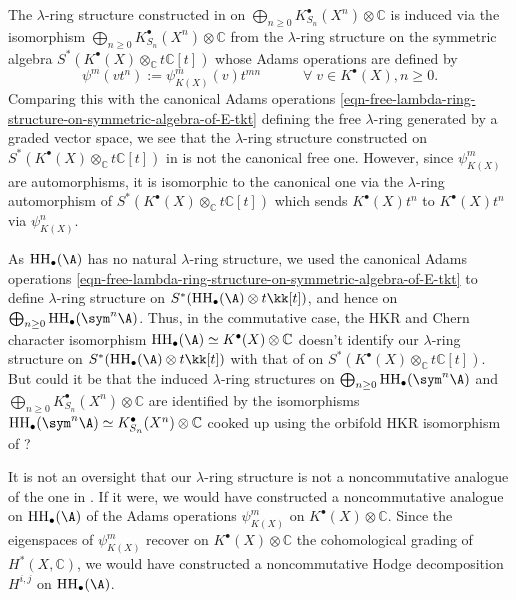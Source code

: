 \documentclass[12pt,a4paper,reqno]{amsart}
\DeclareMathOperator{\hochhom}{{HH}}
\begin{document}
The $\lambda$-ring structure constructed  
in \cite[\S3]{Wang-EquivariantKTheoryWreathProductsAndHeisenbergAlgebra}
on $\bigoplus_{n \geq 0} K^\bullet_{S_n}(X^n) \otimes \mathbb{C}$ is 
induced via the isomorphism 
$\bigoplus_{n \geq 0} K^\bullet_{S_n}(X^n) \otimes \mathbb{C}$
from the $\lambda$-ring structure on the symmetric algebra
$S^* \left(K^\bullet(X) \otimes_\mathbb{C} t\mathbb{C}[t]\right)$ 
whose Adams operations are defined by
$$ 
\psi^{m}(v t^n) := \psi^m_{K(X)}(v) t^{mn} \quad \quad \quad \forall\; 
v \in K^\bullet(X), n \geq 0. $$
Comparing this with the canonical Adams operations 
\eqref{eqn-free-lambda-ring-structure-on-symmetric-algebra-of-E-tkt} 
defining the free $\lambda$-ring generated by a graded
vector space, we see that the $\lambda$-ring structure constructed
on $S^* \left(K^\bullet(X) \otimes_\mathbb{C} t\mathbb{C}[t]\right)$ in
\cite[\S3]{Wang-EquivariantKTheoryWreathProductsAndHeisenbergAlgebra}
is not the canonical free one. However, since $\psi^m_{K(X)}$ are
automorphisms, it is isomorphic to the canonical one via the
$\lambda$-ring automorphism 
of $S^* \left(K^\bullet(X) \otimes_\mathbb{C} t\mathbb{C}[t]\right)$ 
which sends $K^\bullet(X) t^n$ to $K^\bullet(X) t^n$ via $\psi^n_{K(X)}$. 

As $\hochhom_\bullet(\A)$ has no natural $\lambda$-ring structure, 
we used the canonical Adams operations 
\eqref{eqn-free-lambda-ring-structure-on-symmetric-algebra-of-E-tkt} 
to define $\lambda$-ring structure on 
$S^*(\hochhom_\bullet(\A) \otimes t \kk[t])$, and hence on 
$\bigoplus_{n \geq 0} \hochhom_\bullet(\sym^n \A)$. Thus, 
in the commutative case, 
the HKR and Chern character isomorphism 
$\hochhom_\bullet(\A) \simeq K^\bullet(X) \otimes \mathbb{C}$ doesn't 
identify our $\lambda$-ring structure on 
$S^*(\hochhom_\bullet(\A) \otimes t \kk[t])$ with that
of 
\cite[\S3]{Wang-EquivariantKTheoryWreathProductsAndHeisenbergAlgebra}
on $S^* \left(K^\bullet(X) \otimes_\mathbb{C} t\mathbb{C}[t]\right)$. 
But could it be that the induced $\lambda$-ring structures on 
$\bigoplus_{n \geq 0} \hochhom_\bullet(\sym^n \A)$ and 
$\bigoplus_{n \geq 0} K^\bullet_{S_n}(X^n) \otimes \mathbb{C}$
are identified by the isomorphisms 
$\hochhom_\bullet(\sym^n \A) \simeq K^\bullet_{S_n}(X^n) \otimes \mathbb{C}$
cooked up using the orbifold HKR isomorphism of 
\cite[Theorem 1.15]{ArinkinCaldararuHablicsek-FormalityOfDerivedIntersectionsAndTheOrbifoldHKRIsomorphism}?

It is not an oversight that our $\lambda$-ring structure 
is not a noncommutative analogue of the one in
\cite[\S3]{Wang-EquivariantKTheoryWreathProductsAndHeisenbergAlgebra}. 
If it were, we would have constructed a noncommutative analogue on
$\hochhom_\bullet(\A)$ of the Adams operations $\psi^m_{K(X)}$ on 
$K^\bullet(X) \otimes \mathbb{C}$. Since the eigenspaces of $\psi^m_{K(X)}$
recover on $K^\bullet(X) \otimes \mathbb{C}$ 
the cohomological grading of $H^*(X,\mathbb{C})$, 
we would have constructed a noncommutative Hodge decomposition 
$H^{i,j}$ on $\hochhom_\bullet(\A)$. 
\end{document}
